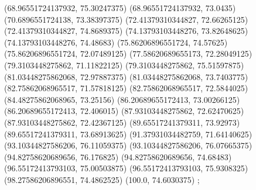 {{{		(68.96551724137932, 75.30247375)
		(68.96551724137932, 73.0435)
		(70.6896551724138, 73.38397375)
		(72.41379310344827, 72.66265125)
		(72.41379310344827, 74.8689375)
		(74.13793103448276, 73.82648625)
		(74.13793103448276, 74.48683)
		(75.86206896551724, 74.57625)
		(75.86206896551724, 72.07489125)
		(77.58620689655173, 72.28049125)
		(79.3103448275862, 71.11822125)
		(79.3103448275862, 75.51597875)
		(81.03448275862068, 72.97887375)
		(81.03448275862068, 73.7403775)
		(82.75862068965517, 71.57818125)
		(82.75862068965517, 72.5844025)
		(84.48275862068965, 73.25156)
		(86.20689655172413, 73.00266125)
		(86.20689655172413, 72.406015)
		(87.93103448275862, 72.62470625)
		(87.93103448275862, 72.42367125)
		(89.65517241379311, 73.92973)
		(89.65517241379311, 73.68913625)
		(91.37931034482759, 71.64140625)
		(93.10344827586206, 76.11059375)
		(93.10344827586206, 76.07665375)
		(94.82758620689656, 76.176825)
		(94.82758620689656, 74.68483)
		(96.55172413793103, 75.00503875)
		(96.55172413793103, 75.9308325)
		(98.27586206896551, 74.4862525)
		(100.0, 74.6030375)
	};

}}

